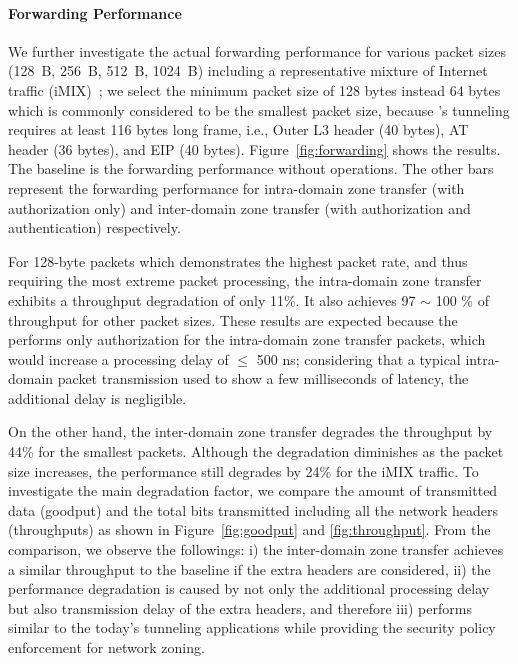 \paragraph{Forwarding Performance}
We further investigate the actual forwarding performance for various packet sizes (\SI{128}{B},
\SI{256}{B}, \SI{512}{B}, \SI{1024}{B}) including a representative mixture of Internet traffic
(iMIX)~\cite{rfc6985}; we select the minimum packet size of 128 bytes instead 64 bytes which is
commonly considered to be the smallest packet size, because \name's tunneling requires at least 116
bytes long frame, i.e., Outer L3 header (40 bytes), AT header
(36 bytes), and EIP (40 bytes). Figure~\ref{fig:forwarding} shows the results. The
baseline is the forwarding performance without \tp operations. The other bars represent the
forwarding performance for intra-domain zone transfer (with authorization only) and inter-domain
zone transfer (with authorization and authentication) respectively.

For 128-byte packets which demonstrates the highest packet rate, and thus requiring the most
extreme packet processing, the intra-domain zone transfer exhibits a throughput degradation
of only 11\%. It also achieves 97 $\sim$ 100 \% of throughput for other packet sizes. These
results are expected because the \tp performs only authorization for the intra-domain zone
transfer packets, which would increase a processing delay of $\leq$ 500 ns; considering that
a typical intra-domain packet transmission used to show a few milliseconds of latency, the
additional delay is negligible.

On the other hand, the inter-domain zone transfer degrades the throughput by 44\% for the
smallest packets. Although the degradation diminishes as the packet size increases, the
performance still degrades by 24\% for the iMIX traffic. To investigate the main degradation
factor, we compare the amount of transmitted data (goodput) and the total bits transmitted
including all the network headers (throughputs) as shown in Figure~\ref{fig:goodput} and
\ref{fig:throughput}. From the comparison, we observe the followings: i) the inter-domain
zone transfer achieves a similar throughput to the baseline if the extra headers are considered,
ii) the performance degradation is caused by not only the additional processing delay but also
transmission delay of the extra headers, and therefore iii) \name performs similar to the
today's tunneling applications while providing the security policy enforcement for network
zoning.







